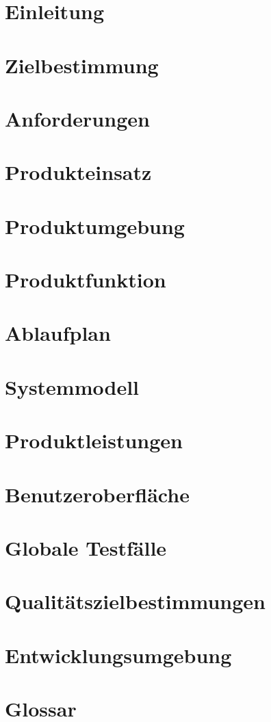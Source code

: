 

	\maketitle
	\setcounter{tocdepth}{1}
	\tableofcontents
	\chapter{Einleitung}
		
	\chapter{Zielbestimmung}
		
	\chapter{Anforderungen}
		
	\chapter{Produkteinsatz}
		
	\chapter{Produktumgebung}
		
	\chapter{Produktfunktion}
		
	\chapter{Ablaufplan}
		
	\chapter{Systemmodell}
		
	\chapter{Produktleistungen}
		
	\chapter{Benutzeroberfläche}
		
	\chapter{Globale Testfälle}
		
	\chapter{Qualitätszielbestimmungen}
		
	\chapter{Entwicklungsumgebung}
		
	\chapter{Glossar}
		
